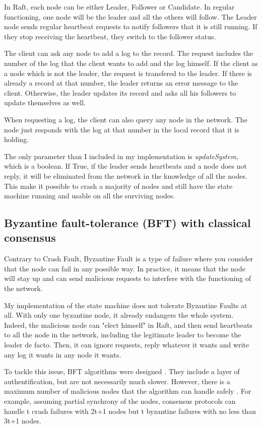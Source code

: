 \documentclass[11pt, twocolumn]{article}
\begin{document}
In Raft, each node can be either Leader, Follower or Candidate. In regular functioning, one node will be the leader and all the others will follow. 
The Leader node sends regular heartbeat requests to notify followers that it is still running. If they stop receiving the heartbeat, they switch to the follower status.

The client can ask any node to add a log to the record. 
The request includes the number of the log that the client wants to add and the log himself. If the client as a node which is not the leader, the request is transfered to the leader. If there is already a record at that number,
the leader returns an error message to the client. Otherwise, the leader updates its record and asks all his followers to update themselves as well. 

When requesting a log, the client can also query any node in the network. The node just responds with the log at that number in the local record that it is holding.

The only parameter than I included in my implementation is \emph{updateSystem}, which is a boolean. If True, if the leader sends heartbeats and a node does not reply, it will be eliminated from the network in the knowledge of all the nodes. This make it possible to 
crash a majority of nodes and still have the state machine running and usable on all the surviving nodes.

\subsection{Byzantine fault-tolerance (BFT) with classical consensus}

Contrary to Crash Fault, Byzantine Fault \cite{byzantine} is a type of failure where you consider that the node can fail in any possible way. In practice, it means that the node will stay up and can send malicious requests to 
interfere with the functioning of the network. 

My implementation of the state machine does not tolerate Byzantine Faults at all. With only one byzantine node, it already endangers the whole system. Indeed, the malicious node can "elect himself" in Raft, and then send heartbeats to all 
the node in the network, including the legitimate leader to become the leader de facto. Then, it can ignore requests, reply whatever it wants and write any log it wants in any node it wants.

To tackle this issue, BFT algorithms were designed \cite{pbft}. They include a layer of authentification, but are not necessarily much slower. However, there is a maximum number of malicious nodes that the algorithm can handle safely \cite{partialSynchrony}. 
For example, assuming partial synchrony of the nodes, consensus protocols can handle t crash failures with 2t+1 nodes but t byzantine failures with no less than 3t+1 nodes.   
\end{document}
